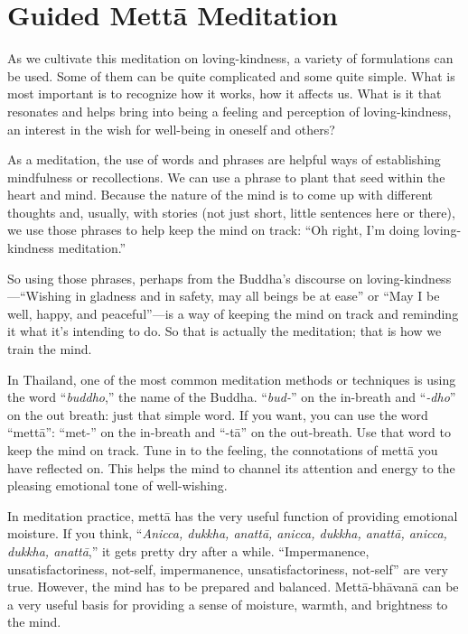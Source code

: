 \chapter{Guided Mettā Meditation}

As we cultivate this meditation on loving-kindness, a variety of
formulations can be used. Some of them can be quite complicated and some
quite simple. What is most important is to recognize how it works, how
it affects us. What is it that resonates and helps bring into being a
feeling and perception of loving-kindness, an interest in the wish for
well-being in oneself and others?

As a meditation, the use of words and phrases are helpful ways of
establishing mindfulness or recollections. We can use a phrase to plant
that seed within the heart and mind. Because the nature of the mind is
to come up with different thoughts and, usually, with stories (not just
short, little sentences here or there), we use those phrases to help
keep the mind on track: “Oh right, I’m doing loving-kindness
meditation.”

So using those phrases, perhaps from the Buddha’s discourse on
loving-kindness—“Wishing in gladness and in safety, may all beings be at
ease” or “May I be well, happy, and peaceful”—is a way of keeping the
mind on track and reminding it what it’s intending to do. So that is
actually the meditation; that is how we train the mind.

In Thailand, one of the most common meditation methods or techniques is
using the word “\emph{buddho},” the name of the Buddha. “\emph{bud-}” on
the in-breath and “\emph{-dho}” on the out breath: just that simple
word. If you want, you can use the word “mettā”: “met-” on the in-breath
and “-tā” on the out-breath. Use that word to keep the mind on track.
Tune in to the feeling, the connotations of mettā you have reflected on.
This helps the mind to channel its attention and energy to the pleasing
emotional tone of well-wishing.

In meditation practice, mettā has the very useful function of providing
emotional moisture. If you think, “\emph{Anicca, dukkha, anattā, anicca,
dukkha, anattā, anicca, dukkha, anattā},” it gets pretty dry after a
while. “Impermanence, unsatisfactoriness, not-self, impermanence,
unsatisfactoriness, not-self” are very true. However, the mind has to be
prepared and balanced. Mettā-bhāvanā can be a very useful basis for
providing a sense of moisture, warmth, and brightness to the mind.

